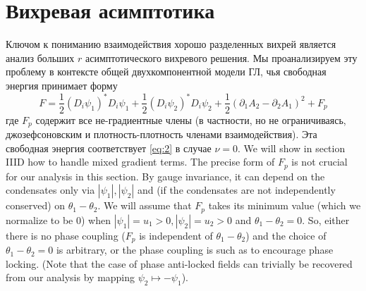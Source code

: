 \chapter{Вихревая асимптотика}
\label{ch:3}

Ключом к пониманию взаимодействия хорошо разделенных вихрей является анализ  
больших \( r \) асимптотического вихревого решения. Мы проанализируем эту 
проблему в контексте общей двухкомпонентной модели ГЛ, чья свободная энергия 
принимает форму
\begin{equation}
    F = \frac{1}{2}\left( D_i \psi_1 \right)^{*} D_i \psi_1 + 
        \frac{1}{2}\left( D_i \psi_2 \right)^{*} D_i \psi_2 + 
        \frac{1}{2}\left( \partial_1 A_2 - \partial_2 A_1 \right)^2 + F_p
    \label{eq:3}
\end{equation}
где \( F_p \) содержит все не-градиентные члены (в частности, но не 
ограничиваясь, джозефсоновским и плотность-плотность членами взаимодействия). 
Эта свободная энергия соответствует \eqref{eq:2} в случае \( \nu = 0 \). 
We will show in section IIID how to handle mixed gradient terms. The precise 
form of \( F_p \) is not crucial for our analysis in this section. By gauge 
invariance, it can depend on the condensates only via \( |\psi_1|, |\psi_2| \) 
and (if the condensates are not independently conserved) on 
\( \theta_1 - \theta_2 \). We will assume that \( F_p \) takes its minimum 
value (which we normalize to be 0) when 
\( |\psi_1| = u_1 > 0, |\psi_2| = u_2 > 0 \) and 
\( \theta_1 - \theta_2 = 0 \). So, either there is no phase coupling 
(\( F_p \) is independent of \( \theta_1 - \theta_2 \)) and the choice of 
\( \theta_1 - \theta_2 = 0 \) is arbitrary, or the phase coupling is such as 
to encourage phase locking. (Note that the case of phase anti-locked fields 
can trivially be recovered from our analysis by mapping 
\( \psi_2 \mapsto -\psi_1 \)).

